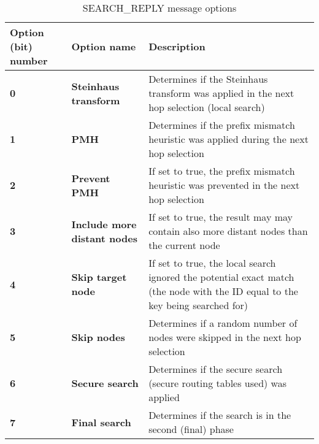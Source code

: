 \begin{table}[H]
\scriptsize
\begin{center}
\begin{tabular}{p{2.7cm} p{3.3cm} p{8.5cm}}
	\hline
	\textbf{Option (bit) number}			& \textbf{Option name}					& \textbf{Description}				\\[1mm]
    \hline
	\textbf{0}								& \textbf{Steinhaus transform}			& Determines if the Steinhaus transform was applied	in the next hop selection (local search)					\\[1.5mm]
    \textbf{1}								& \textbf{PMH}							& Determines if the prefix mismatch heuristic was applied during the next hop selection							\\[1.5mm]
	\textbf{2}								& \textbf{Prevent PMH}					& If set to true, the prefix mismatch heuristic was prevented in the next hop selection							\\[1.5mm]
	\textbf{3}								& \textbf{Include more distant nodes}	& If set to true, the result may may contain also more distant nodes than the current node						\\[1.5mm]
	\textbf{4}								& \textbf{Skip target node}				& If set to true, the local search ignored the potential exact match  (the node with the ID equal to the key being searched for)			\\[1.5mm]
	\textbf{5}								& \textbf{Skip nodes}					& Determines if a random number of nodes were skipped in the next hop selection									\\[1.5mm]
	\textbf{6}								& \textbf{Secure search}				& Determines if the secure search (secure routing tables used) was applied											\\[1.5mm]
	\textbf{7}								& \textbf{Final search}					& Determines if the search is in the second (final) phase														\\[1.5mm]	
    \hline
\end{tabular}
\end{center}
\caption{SEARCH\_REPLY message options}
\label{tab:mSearchReplyOptions}
\end{table}








